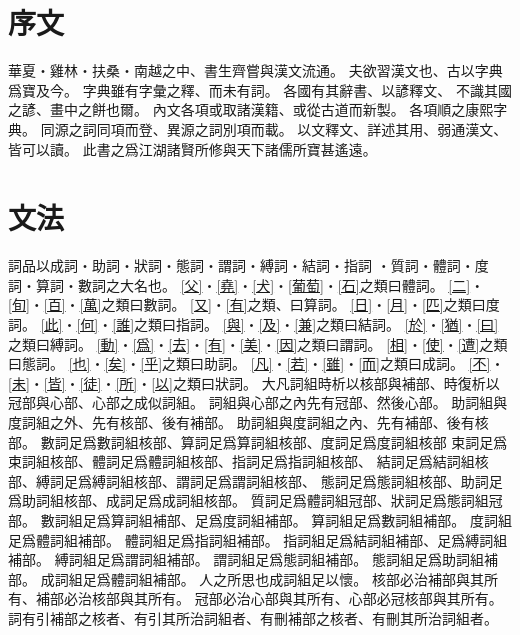 \chapter*{序文}
華夏・雞林・扶桑・南越之中、書生齊嘗與漢文流通。
夫欲習漢文也、古以字典爲寶及今。
字典雖有字彙之釋、而未有詞。
各國有其辭書、以諺釋文、
不識其國之諺、畫中之餅也爾。
內文各項或取諸漢籍、或從古道而新製。
各項順之康熙字典。
同源之詞同項而登、異源之詞別項而載。
以文釋文、詳述其用、弱通漢文、皆可以讀。
此書之爲江湖諸賢所修與天下諸儒所寶甚遙遠。
\chapter*{文法}
詞品以成詞・助詞・狀詞・態詞・謂詞・縛詞・結詞・指詞
・質詞・體詞・度詞・算詞・數詞之大名也。
\cref{父}・\cref{堯}・\cref{犬}・\cref{葡萄}・\cref{石}之類曰體詞。
\cref{二}・\cref{旬}・\cref{百}・\cref{萬}之類曰數詞。
\cref{又}・\cref{有}之類、曰算詞。
\cref{日}・\cref{月}・\cref{匹}之類曰度詞。
\cref{此}・\cref{何}・\cref{誰}之類曰指詞。
\cref{與}・\cref{及}・\cref{兼}之類曰結詞。
\cref{於}・\cref{猶}・\cref{曰}之類曰縛詞。
\cref{動}・\cref{爲}・\cref{去}・\cref{有}・\cref{美}・\cref{因}之類曰謂詞。
\cref{相}・\cref{使}・\cref{遭}之類曰態詞。
\cref{也}・\cref{矣}・\cref{乎}之類曰助詞。
\cref{凡}・\cref{若}・\cref{雖}・\cref{而}之類曰成詞。
\cref{不}・\cref{未}・\cref{皆}・\cref{徒}・\cref{所}・\cref{以}之類曰狀詞。
大凡詞組時析以核部與補部、時復析以冠部與心部、心部之成似詞組。
詞組與心部之內先有冠部、然後心部。
助詞組與度詞組之外、先有核部、後有補部。
助詞組與度詞組之內、先有補部、後有核部。
數詞足爲數詞組核部、算詞足爲算詞組核部、度詞足爲度詞組核部
束詞足爲束詞組核部、體詞足爲體詞組核部、指詞足爲指詞組核部、
結詞足爲結詞組核部、縛詞足爲縛詞組核部、謂詞足爲謂詞組核部、
態詞足爲態詞組核部、助詞足爲助詞組核部、成詞足爲成詞組核部。
質詞足爲體詞組冠部、狀詞足爲態詞組冠部。
數詞組足爲算詞組補部、足爲度詞組補部。
算詞組足爲數詞組補部。
度詞組足爲體詞組補部。
體詞組足爲指詞組補部。
指詞組足爲結詞組補部、足爲縛詞組補部。
縛詞組足爲謂詞組補部。
謂詞組足爲態詞組補部。
態詞組足爲助詞組補部。
成詞組足爲體詞組補部。
人之所思也成詞組足以懷。
核部必治補部與其所有、補部必治核部與其所有。
冠部必治心部與其所有、心部必冠核部與其所有。
詞有引補部之核者、有引其所治詞組者、有刪補部之核者、有刪其所治詞組者。
